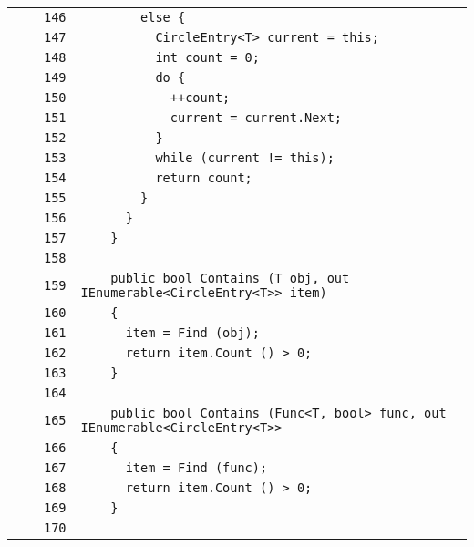 \documentclass[a4paper,10pt]{article}
\begin{document}
\begin{longtable}[l]{lrrl}
\cellcolor{gray} &  & \verb~146~ & \verb~        else {~\\
\cellcolor{gray} &  & \verb~147~ & \verb~          CircleEntry<T> current = this;~\\
\cellcolor{gray} &  & \verb~148~ & \verb~          int count = 0;~\\
\cellcolor{gray} &  & \verb~149~ & \verb~          do {~\\
\cellcolor{gray} &  & \verb~150~ & \verb~            ++count;~\\
\cellcolor{gray} &  & \verb~151~ & \verb~            current = current.Next;~\\
\cellcolor{gray} &  & \verb~152~ & \verb~          }~\\
\cellcolor{gray} &  & \verb~153~ & \verb~          while (current != this);~\\
\cellcolor{gray} &  & \verb~154~ & \verb~          return count;~\\
\cellcolor{gray} &  & \verb~155~ & \verb~        }~\\
\cellcolor{gray} &  & \verb~156~ & \verb~      }~\\
\cellcolor{gray} &  & \verb~157~ & \verb~    }~\\
\cellcolor{gray} &  & \verb~158~ & \verb~~\\
\cellcolor{gray} &  & \verb~159~ & \verb~    public bool Contains (T obj, out IEnumerable<CircleEntry<T>> item)~\\
\cellcolor{gray} &  & \verb~160~ & \verb~    {~\\
\cellcolor{gray} &  & \verb~161~ & \verb~      item = Find (obj);~\\
\cellcolor{gray} &  & \verb~162~ & \verb~      return item.Count () > 0;~\\
\cellcolor{gray} &  & \verb~163~ & \verb~    }~\\
\cellcolor{gray} &  & \verb~164~ & \verb~~\\
\cellcolor{gray} &  & \verb~165~ & \verb~    public bool Contains (Func<T, bool> func, out IEnumerable<CircleEntry<T>> ~\\
\cellcolor{gray} &  & \verb~166~ & \verb~    {~\\
\cellcolor{gray} &  & \verb~167~ & \verb~      item = Find (func);~\\
\cellcolor{gray} &  & \verb~168~ & \verb~      return item.Count () > 0;~\\
\cellcolor{gray} &  & \verb~169~ & \verb~    }~\\
\cellcolor{gray} &  & \verb~170~ & \verb~~\\

\end{longtable}
\end{document}
